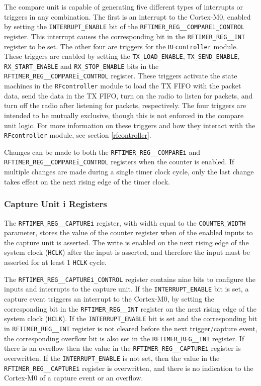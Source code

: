 The compare unit is capable of generating five different types of interrupts or triggers in any combination. The first is an interrupt to the Cortex-M0, enabled by setting the \texttt{INTERRUPT\_ENABLE} bit of the \texttt{RFTIMER\_REG\_\_COMPAREi\_CONTROL} register. This interrupt causes the corresponding bit in the \texttt{RFTIMER\_REG\_\_INT} register to be set. The other four are triggers for the \texttt{RFcontroller} module. These triggers are enabled by setting the \texttt{TX\_LOAD\_ENABLE}, \texttt{TX\_SEND\_ENABLE}, \texttt{RX\_START\_ENABLE} and \texttt{RX\_STOP\_ENABLE} bits in the \texttt{RFTIMER\_REG\_\_COMPAREi\_CONTROL} register. These triggers activate the state machines in the \texttt{RFcontroller} module to load the TX FIFO with the packet data, send the data in the TX FIFO, turn on the radio to listen for packets, and turn off the radio after listening for packets, respectively. The four triggers are intended to be mutually exclusive, though this is not enforced in the compare unit logic. For more information on these triggers and how they interact with the \texttt{RFcontroller} module, see  section \ref{rfcontroller}.

Changes can be made to both the \texttt{RFTIMER\_REG\_\_COMPAREi} and \texttt{RFTIMER\_REG\-\_\_COMPAREi\_CONTROL} registers when the counter is enabled. If multiple changes are made during a single timer clock cycle, only the last change takes effect on the next rising edge of the timer clock.

\subsubsection{Capture Unit i Registers}
The \texttt{RFTIMER\_REG\_\_CAPTUREi} register, with width equal to the \texttt{COUNTER\_WIDTH} parameter, stores the value of the counter register when  of the enabled inputs to the capture unit is asserted. The write is enabled on the next rising edge of the system clock (\texttt{HCLK}) after the input is asserted, and therefore the input must be asserted for at least 1 \texttt{HCLK} cycle.

The \texttt{RFTIMER\_REG\_\_CAPTUREi\_CONTROL} register contains nine bits to configure the inputs and interrupts to the capture unit. If the \texttt{INTERRUPT\_ENABLE} bit is set, a capture event triggers an interrupt to the Cortex-M0, by setting the corresponding bit in the \texttt{RFTIMER\_REG\_\_INT} register on the next rising edge of the system clock (\texttt{HCLK}). If the \texttt{INTERRUPT\_ENABLE} bit is set and the corresponding bit in \texttt{RFTIMER\_REG\_\_INT} register is not cleared before the next trigger/capture event, the corresponding overflow bit is also set in the \texttt{RFTIMER\_REG\_\_INT} register. If there is an overflow then the value in the \texttt{RFTIMER\_REG\_\_CAPTUREi} register is overwritten. If the \texttt{INTERRUPT\_ENABLE} is not set, then the value in the \texttt{RFTIMER\_REG\_\_CAPTUREi} register is overwritten, and there is no indication to the Cortex-M0 of a capture event or an overflow.

